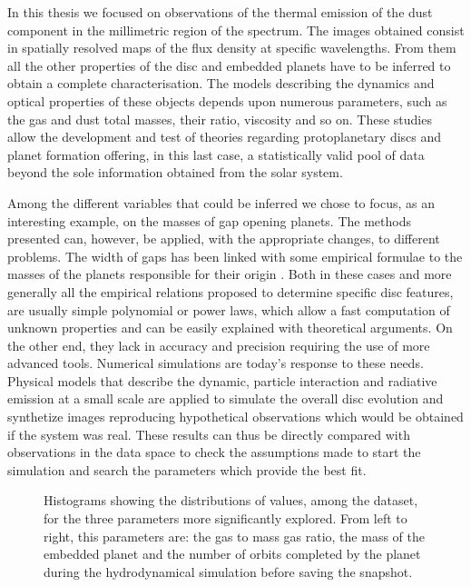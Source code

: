 \documentclass[a4paper,10pt, margin=1cm]{article}
\begin{document}
In this thesis we focused on observations of the thermal emission of the dust component in the
millimetric region of the spectrum. The images obtained consist in spatially resolved maps of
the flux density at specific wavelengths. From them
all the other properties of the disc and embedded planets have to be inferred to 
obtain a complete characterisation. The models describing the dynamics and optical properties 
of these objects depends upon numerous parameters, such as the gas and dust total masses, their ratio, viscosity and so on.
These studies allow the development and test of theories
regarding protoplanetary discs and
planet formation offering, in this last case, a statistically valid pool of data beyond the sole information obtained from the solar system.

Among the different variables that could be inferred we chose to focus, as an interesting 
example, on the masses of gap opening planets. The methods presented can, however, be applied,
with the appropriate changes, to different problems. 
The width of gaps has been linked with some empirical formulae to the masses of the planets responsible for
their origin \citep{Lodato_2019,kanagawa}. Both in these cases and more generally all the empirical relations 
proposed to determine specific disc features, are usually simple polynomial or power laws, which 
allow a fast computation of unknown properties and can be easily explained with theoretical
arguments. On the other end, they lack in accuracy and precision requiring the use of more advanced tools.
Numerical simulations are today's response to these needs. Physical models that describe the dynamic, 
particle interaction and radiative emission at a small scale are applied
to simulate the overall disc evolution and synthetize images reproducing hypothetical observations which would be 
obtained if the system was real.
These results can thus be directly compared  with observations in the data 
space to check the assumptions made to start the simulation and 
search the parameters which provide the best fit. 

\begin{figure}
  \begin{center}
    \scalebox{0.8}{}
  \end{center}
  \caption{Histograms showing the distributions of values, among the dataset, for
  the three parameters more significantly explored. From left to right, this parameters are: the gas to mass gas ratio, 
  the mass of the embedded planet and the number of orbits completed by the planet during the hydrodynamical simulation
  before saving the snapshot.}
\end{figure}
\end{document}
